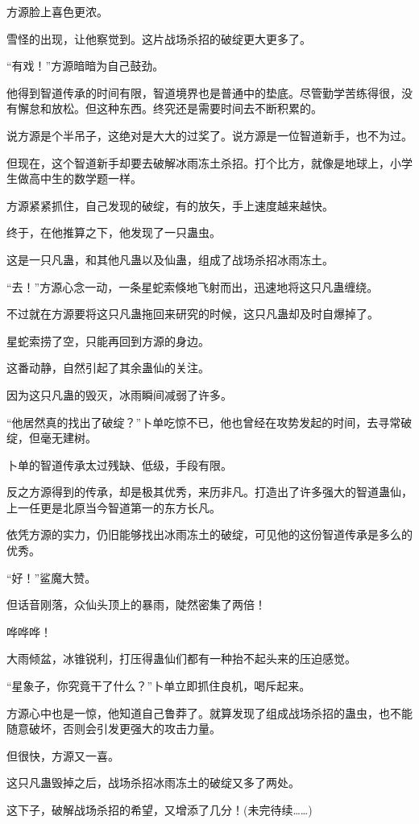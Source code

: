 \begin{this_body}
方源脸上喜色更浓。

雪怪的出现，让他察觉到。这片战场杀招的破绽更大更多了。

“有戏！”方源暗暗为自己鼓劲。

他得到智道传承的时间有限，智道境界也是普通中的垫底。尽管勤学苦练得很，没有懈怠和放松。但这种东西。终究还是需要时间去不断积累的。

说方源是个半吊子，这绝对是大大的过奖了。说方源是一位智道新手，也不为过。

但现在，这个智道新手却要去破解冰雨冻土杀招。打个比方，就像是地球上，小学生做高中生的数学题一样。

方源紧紧抓住，自己发现的破绽，有的放矢，手上速度越来越快。

终于，在他推算之下，他发现了一只蛊虫。

这是一只凡蛊，和其他凡蛊以及仙蛊，组成了战场杀招冰雨冻土。

“去！”方源心念一动，一条星蛇索倏地飞射而出，迅速地将这只凡蛊缠绕。

不过就在方源要将这只凡蛊拖回来研究的时候，这只凡蛊却及时自爆掉了。

星蛇索捞了空，只能再回到方源的身边。

这番动静，自然引起了其余蛊仙的关注。

因为这只凡蛊的毁灭，冰雨瞬间减弱了许多。

“他居然真的找出了破绽？”卜单吃惊不已，他也曾经在攻势发起的时间，去寻常破绽，但毫无建树。

卜单的智道传承太过残缺、低级，手段有限。

反之方源得到的传承，却是极其优秀，来历非凡。打造出了许多强大的智道蛊仙，上一任更是北原当今智道第一的东方长凡。

依凭方源的实力，仍旧能够找出冰雨冻土的破绽，可见他的这份智道传承是多么的优秀。

“好！”鲨魔大赞。

但话音刚落，众仙头顶上的暴雨，陡然密集了两倍！

哗哗哗！

大雨倾盆，冰锥锐利，打压得蛊仙们都有一种抬不起头来的压迫感觉。

“星象子，你究竟干了什么？”卜单立即抓住良机，喝斥起来。

方源心中也是一惊，他知道自己鲁莽了。就算发现了组成战场杀招的蛊虫，也不能随意破坏，否则会引发更强大的攻击力量。

但很快，方源又一喜。

这只凡蛊毁掉之后，战场杀招冰雨冻土的破绽又多了两处。

这下子，破解战场杀招的希望，又增添了几分！(未完待续……)

\end{this_body}

